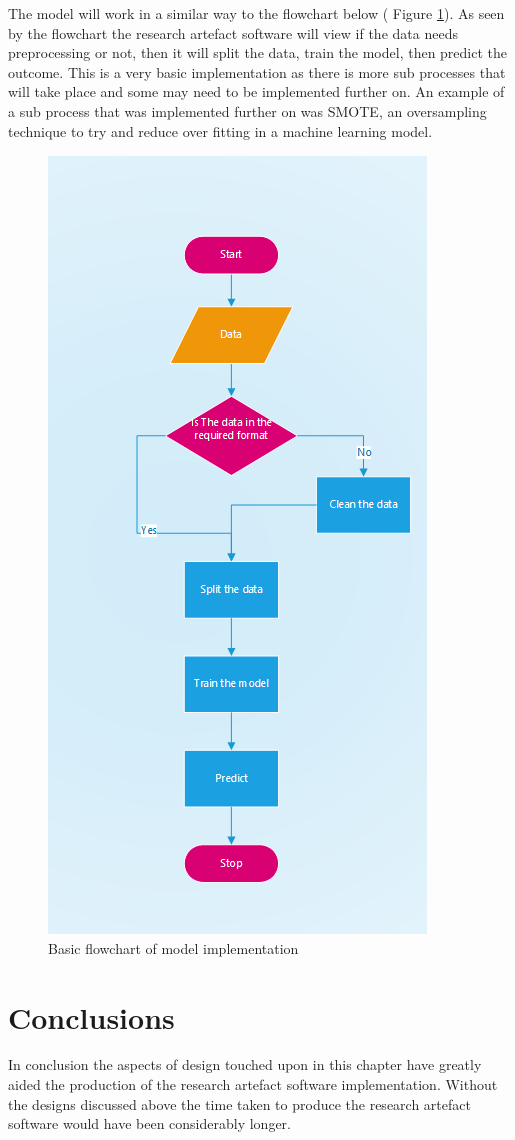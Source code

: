 The model will work in a similar way to the flowchart below ( Figure \ref{fig:FC}). As seen by the flowchart the research artefact software will view if the data needs preprocessing or not, then it will split the data, train the model, then predict the outcome. This is a very basic implementation as there is more sub processes that will take place and some may need to be implemented further on. An example of a sub process that was implemented further on was SMOTE, an oversampling technique to try and reduce over fitting in a machine learning model.
\begin{figure}[h!]
  \centering
  \includegraphics[width = (\textwidth)/2]{flowchart.png}
  \caption{Basic flowchart of model implementation}
  \label{fig:FC}
\end{figure}


\section{Conclusions}
In conclusion the aspects of design touched upon in this chapter have greatly aided the production of the research artefact software implementation. Without the designs discussed above the time taken to produce the research artefact software would have been considerably longer. 
